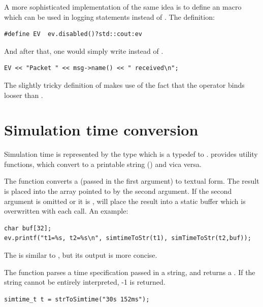 A more sophisticated implementation of the same idea is to define
an  macro which can be used in logging statements instead of
. The definition:

\begin{verbatim}
#define EV  ev.disabled()?std::cout:ev
\end{verbatim}

And after that, one would simply write  instead of .

\begin{verbatim}
EV << "Packet " << msg->name() << " received\n";
\end{verbatim}

The slightly tricky definition of  makes use of the fact
that the \ttt{<<} operator binds looser than .



\section{Simulation time conversion}

Simulation time is represented by the type 
which is a typedef to .
{\opp} provides utility functions, which convert 
to a printable string () and vica versa.

The  function converts a 
(passed in the first argument) to textual form. The result is placed into
the  array pointed to by the second argument. If the second argument is omitted
or it is ,  will place the result into a
static buffer which is overwritten with each call. An example:

\begin{verbatim}
char buf[32];
ev.printf("t1=%s, t2=%s\n", simtimeToStr(t1), simTimeToStr(t2,buf));
\end{verbatim}

The  is similar to ,
but its output is more concise.

The  function parses a time specification passed
in a string, and returns a . If the string cannot
be entirely interpreted, -1 is returned.

\begin{verbatim}
simtime_t t = strToSimtime("30s 152ms");
\end{verbatim}

